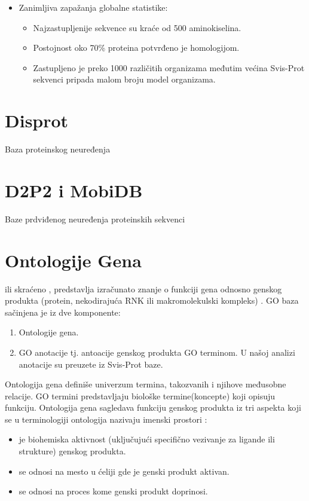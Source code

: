 \begin{itemize}
  \item Zanimljiva zapažanja globalne statistike:
    \begin{itemize}
      \item Najzastupljenije sekvence su kraće od 500 aminokiselina.
      \item Postojnost oko 70\% proteina potvrđeno je homologijom.
      \item Zastupljeno je preko 1000 različitih organizama međutim
        većina Svis-Prot sekvenci pripada malom broju model organizama.
    \end{itemize}
      

\end{itemize}


\section{Disprot}

Baza proteinskog neuređenja 

\section{D2P2 i MobiDB}

Baze prdviđenog neuređenja proteinskih sekvenci


\section{Ontologije Gena}


  ili skraćeno , 
predstavlja izračunato znanje o funkciji gena odnosno genskog
produkta (protein, nekodirajuća RNK ili makromolekulski kompleks)
\parencite{GO2016}.
GO baza sačinjena je iz dve komponente:
\begin{enumerate}
  \item Ontologije gena.
  \item GO anotacije tj. antoacije genskog produkta GO terminom. U našoj
    analizi anotacije su preuzete iz Svis-Prot baze.
\end{enumerate}

Ontologija gena definiše univerzum termina, takozvanih 
 i njihove međusobne relacije. GO termini predstavljaju biološke
termine(koncepte) koji opisuju funkciju. Ontologija gena sagledava funkciju
genskog produkta iz tri aspekta koji se u terminologiji ontologija nazivaju
imenski prostori :
\begin{itemize}
  \item {} je biohemiska aktivnost (uključujući
    specifično vezivanje za ligande ili strukture) genskog produkta.
  \item {} se odnosi na mesto u ćeliji gde je
    genski produkt aktivan.
  \item {} se odnosi na proces kome genski produkt
    doprinosi.
\end{itemize}

